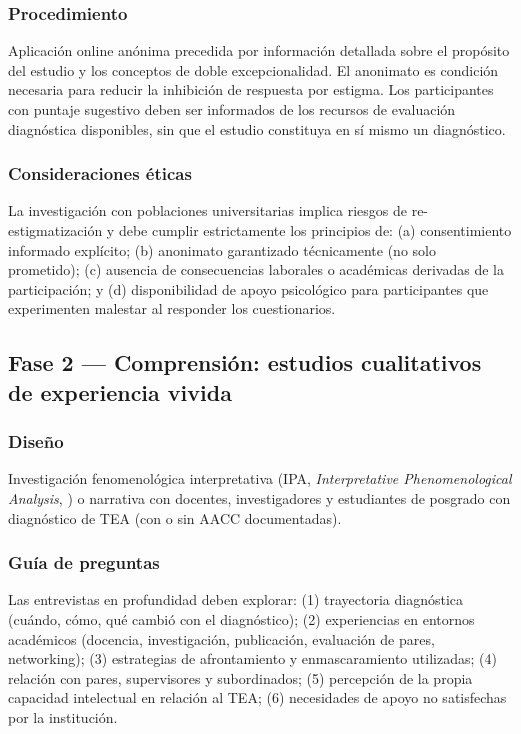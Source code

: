\subsubsection{Procedimiento}

Aplicación online anónima precedida por información detallada sobre el propósito
del estudio y los conceptos de doble excepcionalidad. El anonimato es condición
necesaria para reducir la inhibición de respuesta por estigma. Los participantes
con puntaje sugestivo deben ser informados de los recursos de evaluación
diagnóstica disponibles, sin que el estudio constituya en sí mismo un diagnóstico.

\subsubsection{Consideraciones éticas}

La investigación con poblaciones universitarias implica riesgos de
re-estigmatización y debe cumplir estrictamente los principios de:
(a) consentimiento informado explícito; (b) anonimato garantizado técnicamente
(no solo prometido); (c) ausencia de consecuencias laborales o académicas
derivadas de la participación; y (d) disponibilidad de apoyo psicológico
para participantes que experimenten malestar al responder los cuestionarios.

\subsection{Fase 2 — Comprensión: estudios cualitativos de experiencia vivida}

\subsubsection{Diseño}

Investigación fenomenológica interpretativa (IPA, \textit{Interpretative
Phenomenological Analysis}, \textcite{smith2009}) o narrativa con docentes,
investigadores y estudiantes de posgrado con diagnóstico de TEA (con o sin
AACC documentadas).

\subsubsection{Guía de preguntas}

Las entrevistas en profundidad deben explorar: (1) trayectoria diagnóstica
(cuándo, cómo, qué cambió con el diagnóstico); (2) experiencias en entornos
académicos (docencia, investigación, publicación, evaluación de pares,
networking); (3) estrategias de afrontamiento y enmascaramiento utilizadas;
(4) relación con pares, supervisores y subordinados; (5) percepción de la
propia capacidad intelectual en relación al TEA; (6) necesidades de apoyo
no satisfechas por la institución.

